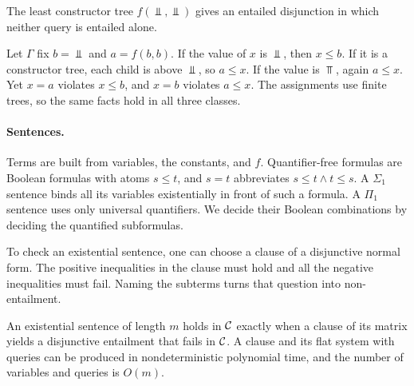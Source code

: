 The least constructor tree $f(\Bot,\Bot)$ gives an entailed disjunction in
which neither query is entailed alone.

\begin{example}\label{ex:split}
Let $\Gamma$ fix $b=\Bot$ and $a=f(b,b)$. If the value of $x$ is $\Bot$,
then $x\le b$. If it is a constructor tree, each child is above $\Bot$,
so $a\le x$. If the value is $\Top$, again $a\le x$. Yet $x=a$ violates
$x\le b$, and $x=b$ violates $a\le x$. The assignments use finite trees,
so the same facts hold in all three classes.
\end{example}

\paragraph*{Sentences.}
Terms are built from variables, the constants, and $f$. Quantifier-free
formulas are Boolean formulas with atoms $s\le t$, and $s=t$ abbreviates
$s\le t\land t\le s$. A $\Sigma_1$ sentence
binds all its variables existentially in front of such a formula. A $\Pi_1$
sentence uses only universal quantifiers. We decide their Boolean
combinations by deciding the quantified subformulas.

To check an existential sentence, one can choose a clause of a disjunctive
normal form. The positive inequalities in the clause must hold and all
the negative inequalities must fail. Naming the subterms turns that
question into non-entailment.

\begin{lemma}\label{lem:clauses}
An existential sentence of length $m$ holds in $\mathcal C$ exactly when a clause
of its matrix yields a disjunctive entailment that fails in $\mathcal C$.
A clause and its flat system with queries can be produced in nondeterministic
polynomial time, and the number of variables and queries is $O(m)$.
\end{lemma}

